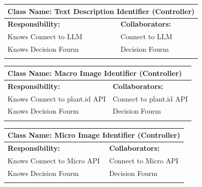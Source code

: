 \documentclass[]{article}
\begin{document}
\begin{itemize}
\begin{table}[ht]
\begin{tabular}{|p{6cm}|p{6cm}|}
		\vspace{1in} & \\
		\hline
		\end{tabular}
	\end{table}
	\begin{table}[ht]
		\centering
		\begin{tabular}{|p{6cm}|p{6cm}|}
		\hline 
		\multicolumn{2}{|l|}{\textbf{Class Name: Text Description Identifier (Controller)}} \\
		\hline
		\textbf{Responsibility:} & \textbf{Collaborators:} \\
		\hline
		Knows Connect to LLM & Connect to LLM \\
		Knows Decision Fourm & Decision Fourm \\ 
		\vspace{1in} & \\
		\hline
		\end{tabular}
	\end{table}
	\begin{table}[ht]
		\centering
		\begin{tabular}{|p{6cm}|p{6cm}|}
		\hline 
		\multicolumn{2}{|l|}{\textbf{Class Name: Macro Image Identifier (Controller)}} \\
		\hline
		\textbf{Responsibility:} & \textbf{Collaborators:} \\
		\hline
		Knows Connect to plant.id API & Connect to plant.id API \\
		Knows Decision Fourm & Decision Fourm \\ 
		\vspace{1in} & \\
		\hline
		\end{tabular}
	\end{table}
	\begin{table}[ht]
		\centering
		\begin{tabular}{|p{6cm}|p{6cm}|}
		\hline 
		\multicolumn{2}{|l|}{\textbf{Class Name: Micro Image Identifier (Controller)}} \\
		\hline
		\textbf{Responsibility:} & \textbf{Collaborators:} \\
		\hline
		Knows Connect to Micro API & Connect to Micro API \\
		Knows Decision Fourm & Decision Fourm \\ 
		\vspace{1in} & \\
		\hline
		\end{tabular}
	\end{table}
	\begin{table}[ht]

\end{table}
\end{itemize}
\end{document}
